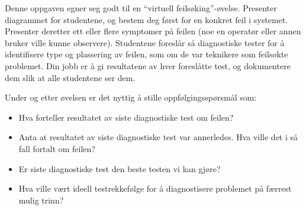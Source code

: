 Denne oppgaven egner seg godt til en ``virtuell feilsøking''-øvelse.  Presenter diagrammet for studentene, og bestem deg først for en konkret feil i systemet.  Presenter deretter ett eller flere symptomer på feilen (noe en operatør eller annen bruker ville kunne observere).  Studentene foreslår så diagnostiske tester for å identifisere type og plassering av feilen, som om de var teknikere som feilsøkte problemet.  Din jobb er å gi resultatene av hver foreslåtte test, og dokumentere dem slik at alle studentene ser dem.

Under og etter øvelsen er det nyttig å stille oppfølgingsspørsmål som:

\begin{itemize}
\item{} Hva forteller resultatet av siste diagnostiske test om feilen?
\item{} Anta at resultatet av siste diagnostiske test var annerledes.  Hva ville det i så fall fortalt om feilen?
\item{} Er siste diagnostiske test den beste testen vi kan gjøre?
\item{} Hva ville vært ideell testrekkefølge for å diagnostisere problemet på færrest mulig trinn?
\end{itemize}


